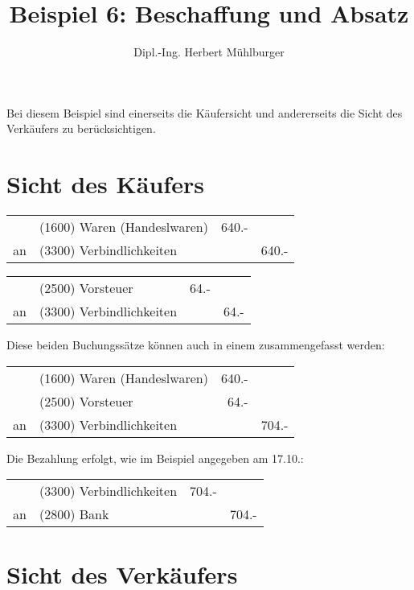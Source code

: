 \documentclass[parskip=half,12pt,a4paper]{scrartcl}
\begin{document}
\title{Beispiel 6: Beschaffung und Absatz}
\author{Dipl.-Ing. Herbert Mühlburger}
\maketitle

Bei diesem Beispiel sind einerseits die Käufersicht und andererseits die Sicht des Verkäufers zu berücksichtigen.

\section{Sicht des Käufers}

\begin{center}
	\begin{tabularx}{\textwidth}{rXrr}
		\toprule
		& (1600) Waren (Handeslwaren) & 640.- &\\
		an & (3300) Verbindlichkeiten & & 640.-\\
		\bottomrule
	\end{tabularx}
\end{center}

\begin{center}
	\begin{tabularx}{\textwidth}{rXrr}
		\toprule
		& (2500) Vorsteuer & 64.- &\\
		an & (3300) Verbindlichkeiten & & 64.-\\
		\bottomrule
	\end{tabularx}
\end{center}

Diese beiden Buchungssätze können auch in einem zusammengefasst werden:

\begin{center}
	\begin{tabularx}{\textwidth}{rXrr}
		\toprule
		& (1600) Waren (Handeslwaren) & 640.- &\\
		& (2500) Vorsteuer & 64.- &\\
		an & (3300) Verbindlichkeiten & & 704.-\\
		\bottomrule
	\end{tabularx}
\end{center}

Die Bezahlung erfolgt, wie im Beispiel angegeben am 17.10.:

\begin{center}
	\begin{tabularx}{\textwidth}{rXrr}
		\toprule
		& (3300) Verbindlichkeiten & 704.- &\\
		an & (2800) Bank & & 704.-\\
		\bottomrule
	\end{tabularx}
\end{center}

\section{Sicht des Verkäufers}
\end{document}

